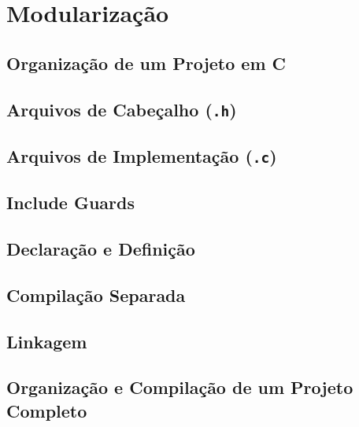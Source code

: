 \chapter{Modularização}

\section{Organização de um Projeto em C}

\section{Arquivos de Cabeçalho (\texttt{.h})}

\section{Arquivos de Implementação (\texttt{.c})}

\section{Include Guards}

\section{Declaração e Definição}

\section{Compilação Separada}

\section{Linkagem}

\section{Organização e Compilação de um Projeto Completo}
